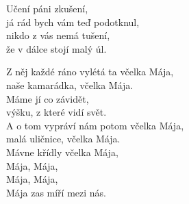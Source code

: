 \vspace{10mm}

\nv{}Učení páni zkušení, \nc{}\\
já rád bych vám teď podotknul,\\
nikdo z vás nemá tušení, \nc{}\\
že v dálce stojí malý úl.\\
\vnv

\nv{}Z něj každé ráno vylétá ta včelka Mája,\\
naše kamarádka, včelka Mája.\\
Máme jí co závidět,\\
výšku, z které vidí svět.\\
A o tom vypráví nám potom včelka Mája,\\
malá uličnice, včelka Mája. \\
Mávne křídly včelka Mája, \\
Mája, Mája,\\
Mája, Mája,\\
Mája zas míří mezi nás.

\newpage
